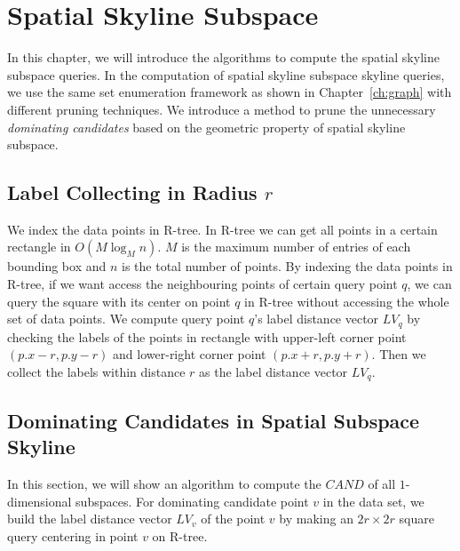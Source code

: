 
%
%

\chapter{Spatial Skyline Subspace}
\label{ch:spatial}

In this chapter, we will introduce the algorithms to compute the spatial skyline subspace queries. In the computation of spatial skyline subspace skyline queries, we use the same set enumeration framework as shown in Chapter~\ref{ch:graph} with different pruning techniques. We introduce a method to prune the unnecessary \emph{dominating candidates} based on the geometric property of spatial skyline subspace.

\section{Label Collecting in Radius $r$}
We index the data points in R-tree. In R-tree we can get all points in a certain rectangle in $O(M \log_M n)$. $M$ is the maximum number of entries of each bounding box and $n$ is the total number of points. By indexing the data points in R-tree, if we want access the neighbouring points of certain query point $q$, we can query the square with its center on point $q$ in R-tree without accessing the whole set of data points. We compute query point $q$'s label distance vector $LV_q$ by checking the labels of the points in rectangle with upper-left corner point $(p.x - r, p.y - r)$ and lower-right corner point $(p.x + r, p.y + r)$. Then we collect the labels within distance $r$ as the label distance vector $LV_q$.

\section{Dominating Candidates in Spatial Subspace Skyline}

In this section, we will show an algorithm to compute the $\mathit{CAND}$ of all $1$-dimensional subspaces. For dominating candidate point $v$ in the data set, we build the label distance vector $LV_v$ of the point $v$ by making an $2r \times 2r$ square query centering in point $v$ on R-tree.

